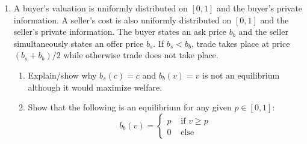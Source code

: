 \documentclass[a4paper,12pt]{article}
\begin{document}
\begin{enumerate}
\item A buyer's valuation is uniformly distributed on $[0,1]$ and the buyer's private information. A seller's cost is also uniformly distributed on $[0,1]$ and the seller's private information. The buyer states an ask price $b_b$ and the seller simultaneously states an offer price $b_s$. If $b_s<b_b$, trade takes place at price $(b_s+b_b)/2$ while otherwise trade does not take place.
  \begin{enumerate}
  \item Explain/show why $b_s(c)=c$ and $b_b(v)=v$ is not an equilibrium although it would maximize welfare. 
  \item Show that the following is an equilibrium for any given $p\in[0,1]$:
    \begin{equation*}
      b_b(v)=
      \begin{cases}
        p & \text{ if }v\geq p\\
        0 & \text{ else }

\end{cases}
\end{equation*}
\end{enumerate}
\end{enumerate}
\end{document}
